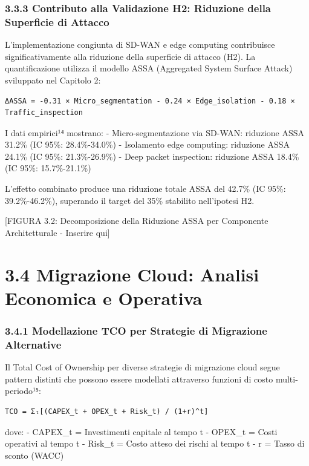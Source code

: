 \documentclass[12pt,a4paper,oneside]{book}
\begin{document}
\subsubsection{3.3.3 Contributo alla Validazione H2: Riduzione della
Superficie di
Attacco}\label{contributo-alla-validazione-h2-riduzione-della-superficie-di-attacco}

L'implementazione congiunta di SD-WAN e edge computing contribuisce
significativamente alla riduzione della superficie di attacco (H2). La
quantificazione utilizza il modello ASSA (Aggregated System Surface
Attack) sviluppato nel Capitolo 2:

\begin{verbatim}
ΔASSA = -0.31 × Micro_segmentation - 0.24 × Edge_isolation - 0.18 × Traffic_inspection
\end{verbatim}

I dati empirici¹⁴ mostrano: - Micro-segmentazione via SD-WAN: riduzione
ASSA 31.2\% (IC 95\%: 28.4\%-34.0\%) - Isolamento edge computing:
riduzione ASSA 24.1\% (IC 95\%: 21.3\%-26.9\%) - Deep packet inspection:
riduzione ASSA 18.4\% (IC 95\%: 15.7\%-21.1\%)

L'effetto combinato produce una riduzione totale ASSA del 42.7\% (IC
95\%: 39.2\%-46.2\%), superando il target del 35\% stabilito
nell'ipotesi H2.

{[}FIGURA 3.2: Decomposizione della Riduzione ASSA per Componente
Architetturale - Inserire qui{]}

\section{3.4 Migrazione Cloud: Analisi Economica e
Operativa}\label{migrazione-cloud-analisi-economica-e-operativa}

\subsubsection{3.4.1 Modellazione TCO per Strategie di Migrazione
Alternative}\label{modellazione-tco-per-strategie-di-migrazione-alternative}

Il Total Cost of Ownership per diverse strategie di migrazione cloud
segue pattern distinti che possono essere modellati attraverso funzioni
di costo multi-periodo¹⁵:

\begin{verbatim}
TCO = Σₜ[(CAPEX_t + OPEX_t + Risk_t) / (1+r)^t]
\end{verbatim}

dove: - CAPEX\_t = Investimenti capitale al tempo t - OPEX\_t = Costi
operativi al tempo t - Risk\_t = Costo atteso dei rischi al tempo t - r
= Tasso di sconto (WACC)
\end{document}
